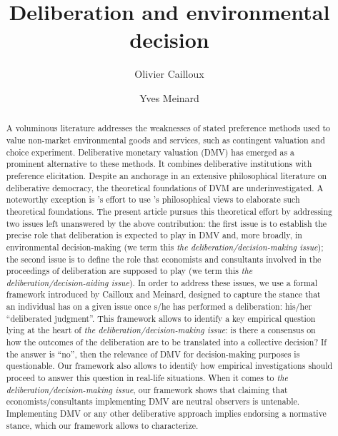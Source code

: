 \documentclass[version=last, pagesize, twoside=off, bibliography=totoc, DIV=calc, fontsize=14pt, a4paper, french, english]{scrartcl}
\newcommand{\institute}[1]{}
\newcommand{\keywords}[1]{}
\begin{document}
\title{Deliberation and environmental decision}
\author{Olivier Cailloux \and Yves Meinard}
\institute{
	Olivier Cailloux 
	\and
	Yves Meinard 
	\at 
	Université Paris-Dauphine, \\
	PSL Research University, \\
	CNRS, \\
	LAMSADE\\
	75016 PARIS, FRANCE\\
	\email{olivier.cailloux@dauphine.fr}
}
\makeatletter
\makeatother
\maketitle

\keywords{decision aid, justification, empirical validation, methodology}

\begin{abstract}
A voluminous literature addresses the weaknesses of stated preference methods used to value non-market environmental goods and services, such as contingent valuation and choice experiment. Deliberative monetary valuation (DMV) has emerged as a prominent alternative to these methods. It combines deliberative institutions with preference elicitation. Despite an anchorage in an extensive philosophical literature on deliberative democracy, the theoretical foundations of DVM are underinvestigated.  A noteworthy exception is \citeauthor{bartkowski_beyond_2018}'s effort to use \citeauthor{sen_idea_2009}'s philosophical views to elaborate such theoretical foundations. The present article pursues this theoretical effort by addressing two issues left unanswered by the above contribution: the first issue is to establish the precise role that deliberation is expected to play in DMV and, more broadly, in environmental decision-making (we term this \emph{the deliberation/decision-making issue}); the second issue is to define the role that economists and consultants involved in the proceedings of deliberation are supposed to play (we term this \emph{the deliberation/decision-aiding issue}). In order to address these issues, we use a formal framework introduced by Cailloux and Meinard, designed to capture the stance that an individual has on a given issue once s/he has performed a deliberation: his/her ``deliberated judgment''. This framework allows to identify a key empirical question lying at the heart of \emph{the deliberation/decision-making issue}: is there a consensus on how the outcomes of the deliberation are to be translated into a collective decision? If the answer is ``no'', then the relevance of DMV for decision-making purposes is questionable. Our framework also allows to identify how empirical investigations should proceed to answer this question in real-life situations. When it comes to \emph{the deliberation/decision-making issue}, our framework shows that claiming that economists/consultants implementing DMV are neutral observers is untenable. Implementing DMV or any other deliberative approach implies endorsing a normative stance, which our framework allows to characterize.
\end{abstract}
\end{document}

